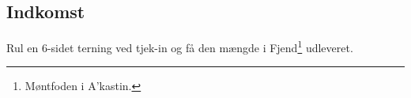 \subsection*{Indkomst}
Rul en 6-sidet terning ved tjek-in og få den mængde i Fjend\footnote{Møntfoden i A'kastin.} udleveret.